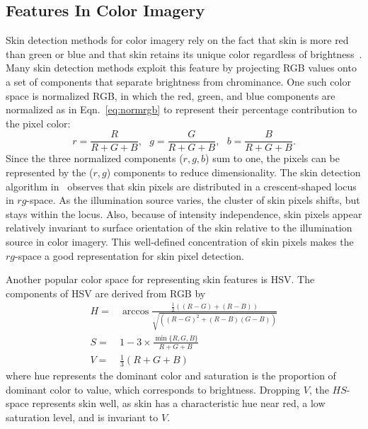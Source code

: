 \documentclass[10pt,journal,cspaper,compsoc]{IEEEtran}
\begin{document}
\subsection{Features In Color Imagery}
\label{sec:visfeatures}
Skin detection methods for color imagery rely on the fact that skin is more red than green or blue and that skin retains its unique color 
regardless of brightness~\cite{Brand1}. Many skin detection methods exploit this feature by projecting RGB values onto a set of components 
that separate brightness from chrominance. One such color space is normalized RGB, in which the red, green, and blue components are 
normalized as in Eqn.~\ref{eq:normrgb} to represent their percentage contribution to the pixel color:
\begin{equation}
\label{eq:normrgb}
r=\frac{R}{R+G+B}, ~~~ g=\frac{G}{R+G+B}, ~~~ b=\frac{B}{R+G+B}. 
\end{equation}
Since the three normalized components ($r,g,b$) sum to one, the pixels can be represented by the ($r,g$) components to reduce dimensionality. 
The skin detection algorithm in~\cite{Storring3} observes that skin pixels are distributed in a crescent-shaped locus in $rg$-space. As the 
illumination source varies, the cluster of skin pixels shifts, but stays within the locus. Also, because of intensity independence, skin 
pixels appear relatively invariant to surface orientation of the skin relative to the illumination source in color imagery. This well-defined 
concentration of skin pixels makes the $rg$-space a good representation for skin pixel detection.	

Another popular color space for representing skin features is HSV. The components of HSV are derived from RGB by 
\begin{equation}
\label{eq:hsv}
\begin{aligned}
H =& \arccos\frac{\frac{1}{2}\left(\left(R-G\right)+\left(R-B\right)\right)}{\sqrt{\left(\left(R-G\right)^2+\left(R-B\right)\left(G-B\right)\right)}} \\
S =& 1-3\times \frac{\min\{R,G,B\}}{R+G+B} \\
V =& \frac{1}{3}\left(R+G+B\right)
\end{aligned}
\end{equation}
where hue represents the dominant color and saturation is the proportion of dominant color to value, which corresponds to brightness. 
Dropping $V$, the $HS$-space represents skin well, as skin has a characteristic hue near red, a low saturation level, and is invariant to $V$.
\end{document}
